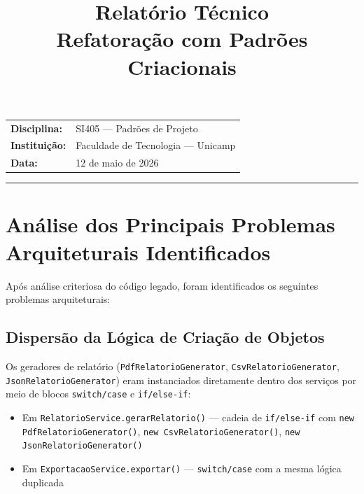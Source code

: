\documentclass[12pt, a4paper]{article}
\title{
    \vspace{-1cm}
    \textbf{\Large Relatório Técnico} \\[0.3cm]
    \textbf{\LARGE Refatoração com Padrões Criacionais}
}
\author{}
\date{}
\begin{document}
\maketitle
\vspace{-1.5cm}

\begin{center}
    \begin{tabular}{ll}
        \textbf{Disciplina:}  & SI405 --- Padrões de Projeto \\
        \textbf{Instituição:} & Faculdade de Tecnologia --- Unicamp \\
        \textbf{Data:}        & 12 de maio de 2026 \\
    \end{tabular}
\end{center}

\vspace{0.5cm}
\hrule
\vspace{0.8cm}

\tableofcontents

\newpage

\section{Análise dos Principais Problemas Arquiteturais Identificados}

Após análise criteriosa do código legado, foram identificados os seguintes problemas arquiteturais:

\subsection{Dispersão da Lógica de Criação de Objetos}

Os geradores de relatório (\texttt{PdfRelatorioGenerator}, \texttt{CsvRelatorioGenerator}, \texttt{JsonRelatorioGenerator}) eram instanciados diretamente dentro dos serviços por meio de blocos \texttt{switch/case} e \texttt{if/else-if}:

\begin{itemize}
    \item Em \texttt{RelatorioService.gerarRelatorio()} --- cadeia de \texttt{if/else-if} com \texttt{new PdfRelatorioGenerator()}, \texttt{new CsvRelatorioGenerator()}, \texttt{new JsonRelatorioGenerator()}
    \item Em \texttt{ExportacaoService.exportar()} --- \texttt{switch/case} com a mesma lógica duplicada
\end{itemize}
\end{document}
